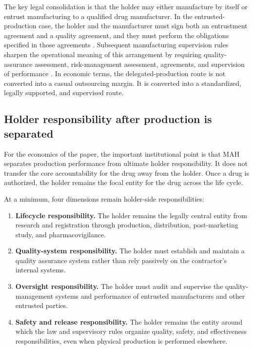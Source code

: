 \documentclass[12pt]{article}
\newcommand{\1}{\mathbf{1}}
\begin{document}
The key legal consolidation is that the holder may either manufacture by itself or entrust manufacturing to a qualified drug manufacturer. In the entrusted-production case, the holder and the manufacturer must sign both an entrustment agreement and a quality agreement, and they must perform the obligations specified in those agreements \citep{DrugAdministrationLaw2019}. Subsequent manufacturing supervision rules sharpen the operational meaning of this arrangement by requiring quality-assurance assessment, risk-management assessment, agreements, and supervision of performance \citep{NMPAManufacturing2022,NMPAEntrustedProduction2023}. In economic terms, the delegated-production route is not converted into a casual outsourcing margin. It is converted into a standardized, legally supported, and supervised route.

\subsection{Holder responsibility after production is separated}

For the economics of the paper, the important institutional point is that MAH separates production performance from ultimate holder responsibility. It does not transfer the core accountability for the drug away from the holder. Once a drug is authorized, the holder remains the focal entity for the drug across the life cycle.

At a minimum, four dimensions remain holder-side responsibilities:
\begin{enumerate}
    \item \textbf{Lifecycle responsibility.} The holder remains the legally central entity from research and registration through production, distribution, post-marketing study, and pharmacovigilance.
    \item \textbf{Quality-system responsibility.} The holder must establish and maintain a quality assurance system rather than rely passively on the contractor's internal systems.
    \item \textbf{Oversight responsibility.} The holder must audit and supervise the quality-management systems and performance of entrusted manufacturers and other entrusted parties.
    \item \textbf{Safety and release responsibility.} The holder remains the entity around which the law and supervisory rules organize quality, safety, and effectiveness responsibilities, even when physical production is performed elsewhere.
\end{enumerate}
\end{document}
